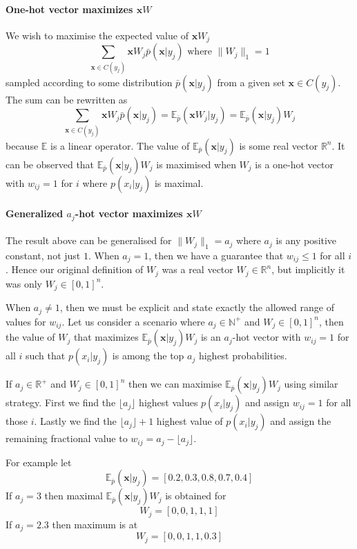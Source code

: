 \documentclass[12pt]{article}
\begin{document}
\paragraph{One-hot vector maximizes $\boldsymbol{x}W$}
We wish to maximise the expected value of $\boldsymbol{x}W_j$ 
\[
\sum_{\boldsymbol{x}\in C(y_j)} \boldsymbol{x} W_j \bar{p}(\boldsymbol{x}|y_j) \text{ where } \lVert W_j \rVert_1=1
\]
sampled according to some distribution $\bar{p}(\boldsymbol{x}|y_j)$ from a given set $\boldsymbol{x}\in C(y_j)$.  The sum can be rewritten as
\[
\sum_{\boldsymbol{x}\in C(y_j)} \boldsymbol{x} W_j \bar{p}(\boldsymbol{x}|y_j) = \mathbb{E}_{\bar{p}}(\boldsymbol{x} W_j|y_j) = \mathbb{E}_{\bar{p}}(\boldsymbol{x}|y_j)W_j
\]
because $\mathbb{E}$ is a linear operator. The value of $\mathbb{E}_{\bar{p}}(\boldsymbol{x}|y_j)$ is some real vector $\mathbb{R}^n$.  It can be observed that $\mathbb{E}_{\bar{p}}(\boldsymbol{x}|y_j)W_j$ is maximised when $W_j$ is a one-hot vector with $w_{ij}=1$ for $i$ where $p(x_i|y_j)$ is maximal. 

\paragraph{Generalized $a_j$-hot vector maximizes $\boldsymbol{x}W$}
The result above can be generalised for $\lVert W_j \rVert_1 = a_j$ where $a_j$ is any positive constant, not just $1$. When $a_j=1$, then we have a guarantee that $w_{ij}\le 1$ for all $i$. Hence our original definition of $W_j$ was a real vector $W_j\in \mathbb{R}^n$, but implicitly it was only $W_j\in [0,1]^n$. 

When $a_j\ne 1$, then we must be explicit and state exactly the allowed range of values for $w_{ij}$. Let us consider a scenario where $a_j\in\mathbb{N}^+$ and $W_j\in [0,1]^n$, then the value of $W_j$ that maximizes $\mathbb{E}_{\bar{p}}(\boldsymbol{x}|y_j)W_j$ is an $a_j$-hot vector with $w_{ij}=1$ for all $i$ such that $p(x_i|y_j)$ is among the top $a_j$ highest probabilities. 

If $a_j\in\mathbb{R}^+$ and $W_j\in [0,1]^n$ then we can maximise $\mathbb{E}_{\bar{p}}(\boldsymbol{x}|y_j)W_j$ using similar strategy. First we find the $\lfloor a_j \rfloor$ highest values $p(x_i|y_j)$ and assign $w_{ij}=1$ for all those $i$. Lastly we find the $\lfloor a_j \rfloor+1$ highest value of $p(x_i|y_j)$ and assign the remaining fractional value to $w_{ij}=a_j - \lfloor a_j \rfloor$. 

For example let 
\[
\mathbb{E}_{\bar{p}}(\boldsymbol{x}|y_j) = [0.2,0.3,0.8,0.7,0.4]
\]
If $a_j=3$ then maximal $\mathbb{E}_{\bar{p}}(\boldsymbol{x}|y_j)W_j$ is obtained for 
\[
W_j=[0,0,1,1,1]
\]
If $a_j=2.3$ then maximum is at
\[
W_j=[0,0,1,1,0.3]
\]
\end{document}
